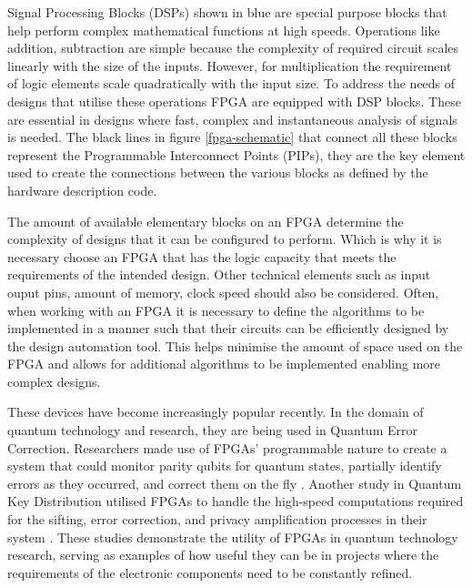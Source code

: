 \documentclass[12pt, twoside]{report}
\begin{document}
Signal Processing Blocks (DSPs) shown in blue are special purpose blocks that help perform complex mathematical functions at high speeds. Operations like addition, subtraction are simple because the complexity of required circuit scales linearly with the size of the inputs. However, for multiplication the requirement of logic elements scale quadratically with the input size. To address the needs of designs that utilise these operations FPGA are equipped with DSP blocks. These are essential in designs where fast, complex and instantaneous analysis of signals is needed. The black lines in figure \ref{fpga-schematic} that connect all these blocks represent the Programmable Interconnect Points (PIPs), they are the key element used to create the connections between the various blocks as defined by the hardware description code. 

\vspace{1em}
The amount of available elementary blocks on an FPGA determine the complexity of designs that it can be configured to perform. Which is why it is necessary choose an FPGA that has the logic capacity that meets the requirements of the intended design. Other technical elements such as input ouput pins, amount of memory, clock speed should also be considered.  Often, when working with an FPGA it is necessary to define the algorithms to be implemented in a manner such that their circuits can be efficiently designed by the design automation tool. This helps minimise the amount of space used on the FPGA and allows for additional algorithms to be implemented enabling more complex designs. 

\vspace{1em}
These devices have become increasingly popular recently. In the domain of quantum technology and research, they are being used in Quantum Error Correction. Researchers made use of FPGAs' programmable nature to create a system that could monitor parity qubits for quantum states, partially identify errors as they occurred, and correct them on the fly \cite{qec-fpga}. Another study in Quantum Key Distribution utilised FPGAs to handle the high-speed computations required for the sifting, error correction, and privacy amplification processes in their system \cite{Zhang2012}. These studies demonstrate the utility of FPGAs in quantum technology research, serving as examples of how useful they can be in projects where the requirements of the electronic components need to be constantly refined.
\end{document}
